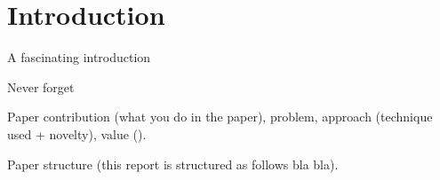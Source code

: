 
\section{Introduction}
\label{sec:introduction}

A fascinating introduction

Never forget \cite{2018arXiv180808929C}

Paper contribution (what you do in the paper),
problem,
approach (technique used + novelty),
value ().

Paper structure (this report is structured as follows bla bla).
